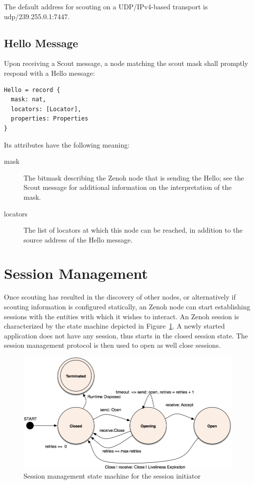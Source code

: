 \documentclass[a4paper,oneside,article]{memoir}
\begin{document}
The default address for scouting on a UDP/IPv4-based transport is udp/239.255.0.1:7447.

\subsection{Hello Message}

Upon receiving a Scout message, a node matching the scout mask shall promptly respond with a Hello
message:
\begin{verbatim}
Hello = record {
  mask: nat,
  locators: [Locator],
  properties: Properties
}  
\end{verbatim}

Its attributes have the following meaning:
\begin{description}
\item[mask] The bitmask describing the Zenoh node that is sending the Hello; see the Scout message
  for additional information on the interpretation of the mask.
\item[locators] The list of locators at which this node can be reached, in addition to the source
  address of the Hello message.
\end{description}


\section{Session Management}

Once scouting has resulted in the discovery of other nodes, or alternatively if scouting information
is configured statically, an Zenoh node can start establishing sessions with the entities with which
it wishes to interact.  An Zenoh session is characterized by the state machine depicted in
Figure~\ref{fig:session-initiator}.  A newly started application does not have any session, thus
starts in the closed session state.  The session management protocol is then used to open as well
close sessions.

\begin{figure}
\centering
\includegraphics[scale=0.3]{session-initiator.png}
\caption{Session management state machine for the session initiator}\label{fig:session-initiator}
\end{figure}
\end{document}
